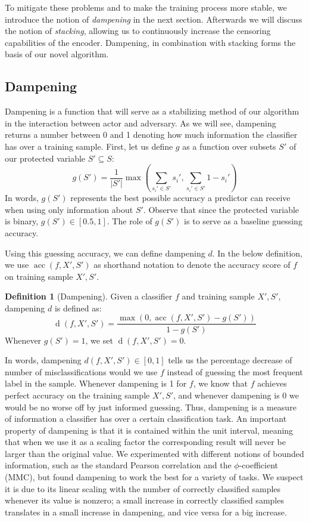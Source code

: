 \documentclass[nohyperref]{article}
\theoremstyle{plain}
\theoremstyle{definition}
\newtheorem{definition}[theorem]{Definition}
\theoremstyle{remark}
\begin{document}
To mitigate these problems and to make the training process more stable, we introduce the notion of \emph{dampening} in the next section. Afterwards we will discuss the notion of \emph{stacking}, allowing us to continuously increase the censoring capabilities of the encoder. Dampening, in combination with stacking forms the basis of our novel algorithm.
\subsection{Dampening}
Dampening is a function that will serve as a stabilizing method of our algorithm in the interaction between actor and adversary. As we will see, dampening returns a number between 0 and 1 denoting how much information the classifier has over a training sample. First, let us define $g$ as a function over subsets $S'$ of our protected variable $S' \subseteq S$:
\[
g(S') = \frac{1}{|S'|}\max\left(\sum_{s_i'\in S'} s_i', \sum_{s_i'\in S'} 1- s_i'\right) 
\]
In words, $g(S')$ represents the best possible accuracy a predictor can receive when using only information about $S'$. Observe that since the protected variable is binary, $g(S') \in [0.5,1]$. The role of $g(S')$ is to serve as a baseline guessing accuracy.

Using this guessing accuracy, we can define dampening $d$. In the below definition, we use $\mathop{acc}(f,X',S')$ as shorthand notation to denote the accuracy score of $f$ on training sample $X',S'$.
\begin{definition}[Dampening]Given a classifier $f$ and training sample $X',S'$, dampening $d$ is defined as:
\[
\mathop{d}(f, X', S') = \frac{\max(0, \mathop{acc}(f, X', S') - g(S'))}{1-g(S')}
\]
Whenever $g(S')=1$, we set $\mathop{d}(f,X',S') = 0$.
\end{definition}
In words, dampening $d(f, X', S') \in [0,1]$ tells us the percentage decrease of number of misclassifications would we use $f$ instead of guessing the most frequent label in the sample. Whenever dampening is 1 for $f$, we know that $f$ achieves perfect accuracy on the training sample $X', S'$, and whenever dampening is 0 we would be no worse off by just informed guessing. Thus, dampening is a measure of information a classifier has over a certain classification task. An important property of dampening is that it is contained within the unit interval, meaning that when we use it as a scaling factor the corresponding result will never be larger than the original value. We experimented with different notions of bounded information, such as the standard Pearson correlation and the $\phi$-coefficient (MMC), but found dampening to work the best for a variety of tasks. We suspect it is due to its linear scaling with the number of correctly classified samples whenever its value is nonzero; a small increase in correctly classified samples translates in a small increase in dampening, and vice versa for a big increase.
\end{document}

